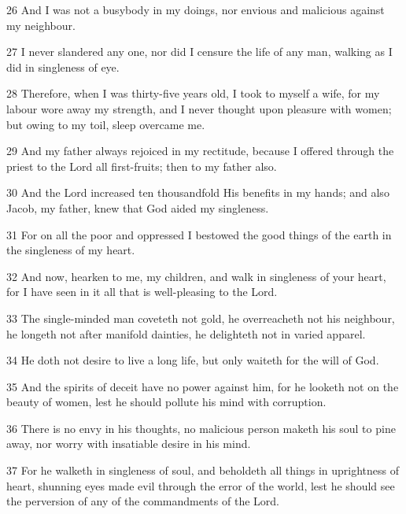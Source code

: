 \par 26 And I was not a busybody in my doings, nor envious and malicious against my neighbour.

\par 27 I never slandered any one, nor did I censure the life of any man, walking as I did in singleness of eye.

\par 28 Therefore, when I was thirty-five years old, I took to myself a wife, for my labour wore away my strength, and I never thought upon pleasure with women; but owing to my toil, sleep overcame me.

\par 29 And my father always rejoiced in my rectitude, because I offered through the priest to the Lord all first-fruits; then to my father also.

\par 30 And the Lord increased ten thousandfold His benefits in my hands; and also Jacob, my father, knew that God aided my singleness.

\par 31 For on all the poor and oppressed I bestowed the good things of the earth in the singleness of my heart.

\par 32 And now, hearken to me, my children, and walk in singleness of your heart, for I have seen in it all that is well-pleasing to the Lord.

\par 33 The single-minded man coveteth not gold, he overreacheth not his neighbour, he longeth not after manifold dainties, he delighteth not in varied apparel.

\par 34 He doth not desire to live a long life, but only waiteth for the will of God.

\par 35 And the spirits of deceit have no power against him, for he looketh not on the beauty of women, lest he should pollute his mind with corruption.

\par 36 There is no envy in his thoughts, no malicious person maketh his soul to pine away, nor worry with insatiable desire in his mind.

\par 37 For he walketh in singleness of soul, and beholdeth all things in uprightness of heart, shunning eyes made evil through the error of the world, lest he should see the perversion of any of the commandments of the Lord.


